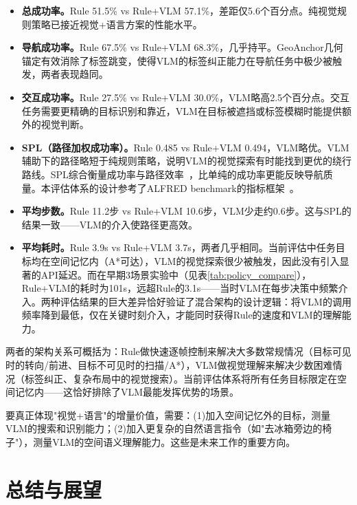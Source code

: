 \documentclass{SYSUReport}
\begin{document}
\begin{itemize}
  \item \textbf{总成功率。}Rule 51.5\% vs Rule+VLM 57.1\%，差距仅5.6个百分点。纯视觉规则策略已接近视觉+语言方案的性能水平。
  \item \textbf{导航成功率。}Rule 67.5\% vs Rule+VLM 68.3\%，几乎持平。GeoAnchor几何锚定有效消除了标签跳变，使得VLM的标签纠正能力在导航任务中极少被触发，两者表现趋同。
  \item \textbf{交互成功率。}Rule 27.5\% vs Rule+VLM 30.0\%，VLM略高2.5个百分点。交互任务需要更精确的目标识别和靠近，VLM在目标被遮挡或标签模糊时能提供额外的视觉判断。
  \item \textbf{SPL（路径加权成功率）。}Rule 0.485 vs Rule+VLM 0.494，VLM略优。VLM辅助下的路径略短于纯规则策略，说明VLM的视觉探索有时能找到更优的绕行路线。SPL综合衡量成功率与路径效率~\cite{anderson2018spl}，比单纯的成功率更能反映导航质量。本评估体系的设计参考了ALFRED benchmark的指标框架~\cite{shridhar2020alfred}。
  \item \textbf{平均步数。}Rule 11.2步 vs Rule+VLM 10.6步，VLM少走约0.6步。这与SPL的结果一致——VLM的介入使路径更高效。
  \item \textbf{平均耗时。}Rule 3.9s vs Rule+VLM 3.7s，两者几乎相同。当前评估中任务目标均在空间记忆内（A*可达），VLM的视觉探索很少被触发，因此没有引入显著的API延迟。而在早期3场景实验中（见表\ref{tab:policy_compare}），Rule+VLM的耗时为101s，远超Rule的3.1s——当时VLM在每步决策中频繁介入。两种评估结果的巨大差异恰好验证了混合架构的设计逻辑：将VLM的调用频率降到最低，仅在关键时刻介入，才能同时获得Rule的速度和VLM的理解能力。
\end{itemize}

两者的架构关系可概括为：Rule做快速逐帧控制来解决大多数常规情况（目标可见时的转向/前进、目标不可见时的扫描/A*），VLM做视觉理解来解决少数困难情况（标签纠正、复杂布局中的视觉搜索）。当前评估体系将所有任务目标限定在空间记忆内——这恰好排除了VLM最能发挥优势的场景。

要真正体现"视觉+语言"的增量价值，需要：(1)加入空间记忆外的目标，测量VLM的搜索和识别能力；(2)加入更复杂的自然语言指令（如"去冰箱旁边的椅子"），测量VLM的空间语义理解能力。这些是未来工作的重要方向。

\section{总结与展望}
\end{document}

